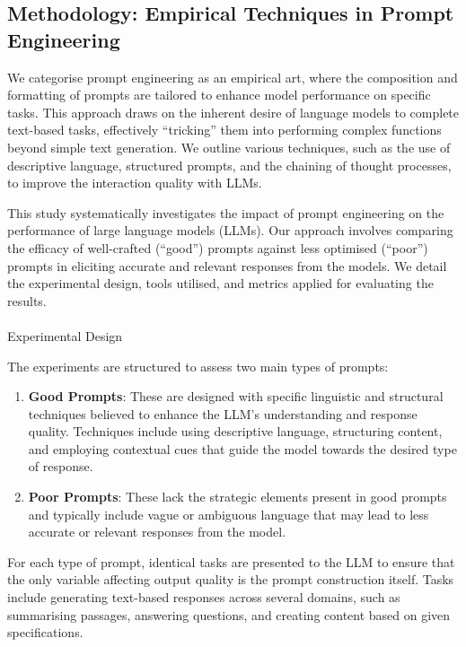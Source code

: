 \documentclass[
]{agujournal2019}
\makeatletter
\let\oldparagraph\paragraph
\renewcommand{\paragraph}{
    \@ifstar
      \xxxParagraphStar
      \xxxParagraphNoStar
  }
\newcommand{\xxxParagraphStar}[1]{\oldparagraph*{#1}\mbox{}}
\newcommand{\xxxParagraphNoStar}[1]{\oldparagraph{#1}\mbox{}}
\makeatother
\begin{document}
\subsection{Methodology: Empirical Techniques in Prompt
Engineering}\label{methodology-empirical-techniques-in-prompt-engineering}

We categorise prompt engineering as an empirical art, where the
composition and formatting of prompts are tailored to enhance model
performance on specific tasks. This approach draws on the inherent
desire of language models to complete text-based tasks, effectively
``tricking'' them into performing complex functions beyond simple text
generation. We outline various techniques, such as the use of
descriptive language, structured prompts, and the chaining of thought
processes, to improve the interaction quality with LLMs.

This study systematically investigates the impact of prompt engineering
on the performance of large language models (LLMs). Our approach
involves comparing the efficacy of well-crafted (``good'') prompts
against less optimised (``poor'') prompts in eliciting accurate and
relevant responses from the models. We detail the experimental design,
tools utilised, and metrics applied for evaluating the results.

\paragraph{Experimental Design}\label{experimental-design}

The experiments are structured to assess two main types of prompts:

\begin{enumerate}
\def\labelenumi{\arabic{enumi}.}
\item
  \textbf{Good Prompts}: These are designed with specific linguistic and
  structural techniques believed to enhance the LLM's understanding and
  response quality. Techniques include using descriptive language,
  structuring content, and employing contextual cues that guide the
  model towards the desired type of response.
\item
  \textbf{Poor Prompts}: These lack the strategic elements present in
  good prompts and typically include vague or ambiguous language that
  may lead to less accurate or relevant responses from the model.
\end{enumerate}

For each type of prompt, identical tasks are presented to the LLM to
ensure that the only variable affecting output quality is the prompt
construction itself. Tasks include generating text-based responses
across several domains, such as summarising passages, answering
questions, and creating content based on given specifications.
\end{document}
